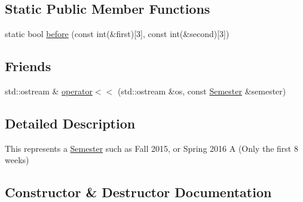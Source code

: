 \subsection*{Static Public Member Functions}
\begin{DoxyCompactItemize}
\item 
static bool \hyperlink{class_semester_a0ae33f9a24ff4e26f9432382429e9dac}{before} (const int(\&first)\mbox{[}3\mbox{]}, const int(\&second)\mbox{[}3\mbox{]})
\end{DoxyCompactItemize}
\subsection*{Friends}
\begin{DoxyCompactItemize}
\item 
std\+::ostream \& \hyperlink{class_semester_a14d21f9226dbba48d3f3df72cb254ac8}{operator$<$$<$} (std\+::ostream \&os, const \hyperlink{class_semester}{Semester} \&semester)
\end{DoxyCompactItemize}


\subsection{Detailed Description}
This represents a \textquotesingle{}\hyperlink{class_semester}{Semester}\textquotesingle{} such as Fall 2015, or Spring 2016 A (Only the first 8 weeks) 

\subsection{Constructor \& Destructor Documentation}
\hypertarget{class_semester_a1922b7c568fc93f922cc8d36410d107c}{}
